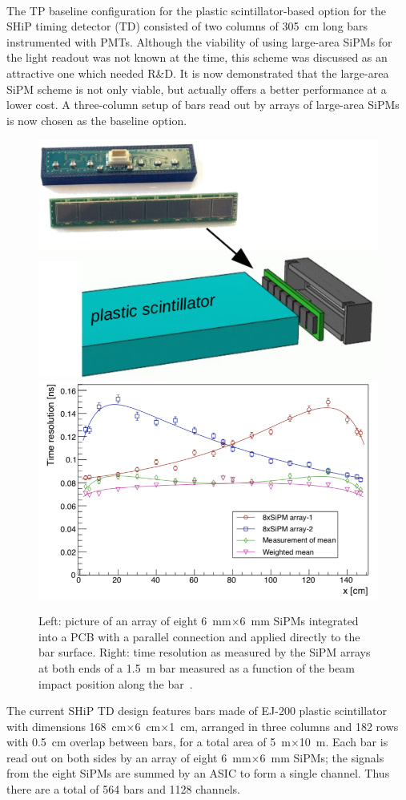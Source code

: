 \\
\noindent
The TP baseline configuration for the plastic scintillator-based option for the SHiP timing detector (TD) consisted of two columns of 305~cm long bars instrumented with PMTs. Although the viability of using large-area SiPMs for the light readout was not known at the time, this scheme was discussed as an attractive one which needed R\&D. It is now demonstrated that the large-area SiPM scheme is not only viable, but actually offers a better performance at a lower cost. A three-column setup of bars read out by arrays of large-area SiPMs is now chosen as the baseline option. 
%
\begin{figure}[h]
\centering
\includegraphics[width=0.35\columnwidth]{figs/DecaySpectrometer/TD_SiPM.png}
\includegraphics[width=0.55\columnwidth]{figs/DecaySpectrometer/TD_dt.png}
\caption{Left: picture of an array of eight 6~mm$\times$6~mm SiPMs integrated into a PCB with a parallel connection and applied directly to the bar surface. Right: time resolution as measured by the
SiPM arrays at both ends of a 1.5~m bar measured as a function of the beam impact position along the bar~\cite{Betancourt:2017sex}.}
\label{fig:TD}
\end{figure}
%
The current SHiP TD design features bars made of EJ-200 plastic scintillator with dimensions 168~cm$\times$6~cm$\times$1~cm, arranged in three columns and 182 rows with 0.5~cm overlap between bars, for a total area of 5~m$\times$10~m. Each bar is read out on both sides by an array of eight 6~mm$\times$6~mm SiPMs; the signals from the eight SiPMs are summed by an ASIC to form a single channel. Thus there are a total of 564 bars and 1128 channels.  

